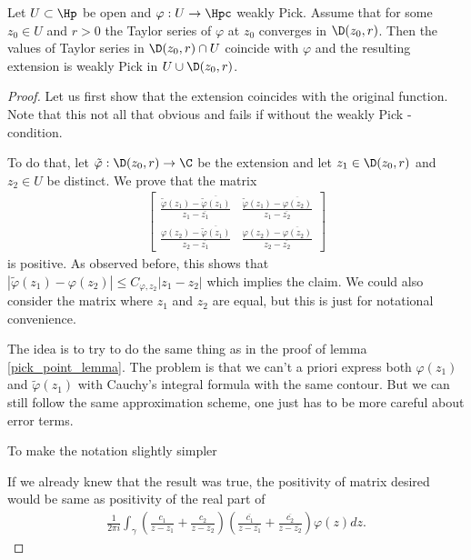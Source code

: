 \begin{lem}
	Let $U \subset \Hp$ be open and $\varphi : U \to \Hpc$ weakly Pick. Assume that for some $z_{0} \in U$ and $r > 0$ the Taylor series of $\varphi$ at $z_{0}$ converges in $\D(z_{0}, r)$. Then the values of Taylor series in $\D(z_{0}, r) \cap U$ coincide with $\varphi$ and the resulting extension is weakly Pick in $U \cup \D(z_{0}, r)$.
\end{lem}
\begin{proof}
	Let us first show that the extension coincides with the original function. Note that this not all that obvious and fails if without the weakly Pick -condition.

	To do that, let $\tilde{\varphi} : \D(z_{0}, r) \to \C$ be the extension and let $z_{1} \in \D(z_{0}, r)$ and $z_{2} \in U$ be distinct. We prove that the matrix
	\begin{align*}
		\begin{bmatrix}
		\frac{\tilde{\varphi}(z_{1}) -  \overline{\tilde{\varphi}(z_{1})}}{z_{1} - \overline{z_{1}}} & \frac{\tilde{\varphi}(z_{1}) -  \overline{\varphi(z_{2})}}{z_{1} - \overline{z_{2}}} \\
		\frac{\varphi(z_{2}) -  \overline{\tilde{\varphi}(z_{1})}}{z_{2} - \overline{z_{1}}} & \frac{\varphi(z_{2}) -  \overline{\varphi(z_{2})}}{z_{2} - \overline{z_{2}}}
		\end{bmatrix}
	\end{align*}
	is positive. As observed before, this shows that $|\tilde{\varphi}(z_{1}) - \varphi(z_{2})| \leq C_{\varphi, z_{2}} |z_{1} - z_{2}|$ which implies the claim. We could also consider the matrix where $z_{1}$ and $z_{2}$ are equal, but this is just for notational convenience.

	The idea is to try to do the same thing as in the proof of lemma \ref{pick_point_lemma}. The problem is that we can't a priori express both $\varphi(z_{1})$ and $\tilde{\varphi}(z_{1})$ with Cauchy's integral formula with the same contour. But we can still follow the same approximation scheme, one just has to be more careful about error terms.

	To make the notation slightly simpler 

	If we already knew that the result was true, the positivity of matrix desired would be same as positivity of the real part of
	\begin{align*}
		\frac{1}{2 \pi i}\int_{\gamma} \left(\frac{c_{1}}{z - z_{1}} + \frac{c_{2}}{z - z_{2}} \right)  \left(\frac{\overline{c_{1}}}{z - \overline{z_{1}}} + \frac{\overline{c_{2}}}{z - \overline{z_{2}}} \right)\varphi(z) dz.
	\end{align*}


\end{proof}
